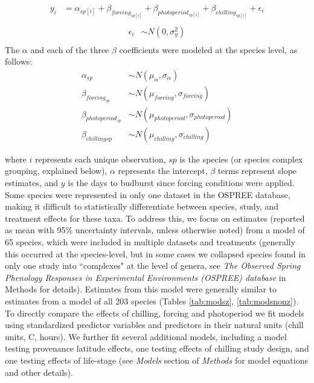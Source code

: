 \documentclass{article}
\begin{document}
\begin{align*}
y_i &= \alpha_{sp[i]} + \beta_{forcing_{sp[i]}} + \beta_{photoperiod_{sp[i]}} + \beta_{chilling_{sp[i]}} + \epsilon_i\\
\end{align*}
\begin{align*}
\epsilon_i & \sim N(0,\sigma^2_y) \\
\end{align*}
\noindent The $\alpha$ and each of the three $\beta$ coefficients were modeled at the species level, as follows:
\begin{align*}
\alpha_{sp} & \sim N(\mu_{\alpha}, \sigma_{\alpha}) \\
\beta_{forcing_{sp}} & \sim N(\mu_{forcing}, \sigma_{forcing}) \\
\beta_{photoperiod_{sp}} & \sim N(\mu_{photoperiod}, \sigma_{photoperiod})\\
\beta_{chilling{sp}} & \sim N(\mu_{chilling}, \sigma_{chilling})
\end{align*}

where $i$ represents each unique observation, $sp$ is the species (or species complex grouping, explained below), $\alpha$ represents the intercept, $\beta$ terms represent slope estimates, and $y$ is the days to budburst since forcing conditions were applied. Some species were represented in only one dataset in the OSPREE database, making it difficult to statistically differentiate between species, study, and treatment effects for these taxa. To address this, we focus on estimates (reported as mean with 95\% uncertainty intervals, unless otherwise noted) from a model of 65 species, which were included in multiple datasets and treatments (generally this occurred at the species-level, but in some cases we collapsed species found in only one study into ``complexes" at the level of genera, see \emph{The Observed Spring Phenology Responses in Experimental Environments (OSPREE) database} in Methods for details). Estimates from this model were generally similar to estimates from a model of all 203 species (Tables \ref{tab:modsz}, \ref{tab:modsnonz}). To directly compare the effects of chilling, forcing and photoperiod we fit models using standardized predictor variables \emph{\citep[{\normalfont following}][{\normalfont which we refer to as ``standard units''}]{gelman2006}} and predictors in their natural units (chill units, \degree C, hours). We further fit several additional models, including a model testing provenance latitude effects, one testing effects of chilling study design, and one testing effects of life-stage (see \emph{Models} section of \emph{Methods} for model equations and other details). 
\end{document}
